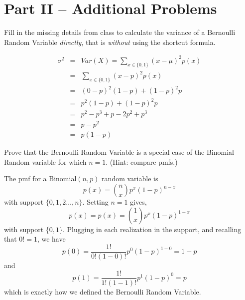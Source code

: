\documentclass[addpoints,12pt]{exam}
\begin{document}
\section*{Part II -- Additional Problems}
\begin{questions}


	\question Fill in the missing details from class to calculate the variance of a Bernoulli Random Variable \emph{directly}, that is \emph{without} using the shortcut formula.
	\begin{solution} 
	\begin{eqnarray*}
	\sigma^2 &=& Var(X) = \sum_{x \in \{0,1\}} (x - \mu)^2 p(x)\\ 
	&=& \sum_{x \in \{0,1\}} (x - p)^2 p(x)\\
	 &=& (0 - p)^2 (1-p) + (1-p)^2 p \\
	 &=& p^2(1-p) + (1-p)^2 p\\ 
	 &=& p^2 - p^3 + p - 2p^2 +p^3 \\
	 &=& p - p^2\\ 
	 &=&p(1-p)
\end{eqnarray*}
	\end{solution}

\question Prove that the Bernoulli Random Variable is a special case of the Binomial Random variable for which $n = 1$.	 (Hint: compare pmfs.)
	\begin{solution}
		The pmf for a Binomial$(n,p)$ random variable is
		$$p(x) = {\binom{n}{x}} p^x (1-p)^{n-x}$$
		with support $\{0, 1, 2\hdots, n\}$. Setting $n=1$ gives,
		$$p(x) = p(x) = {\binom{1}{x}} p^x (1-p)^{1-x}$$
		with support $\{0,1\}$. Plugging in each realization in the support, and recalling that $0! = 1$, we have
			$$p(0) = \frac{1!}{0!(1-0)!} p^0 (1-p)^{1-0} = 1 - p$$
		and
		$$p(1) = \frac{1!}{1!(1-1)!} p^1 (1-p)^0 = p$$
		which is exactly how we defined the Bernoulli Random Variable.
	\end{solution}
	

\end{questions}
\end{document}
